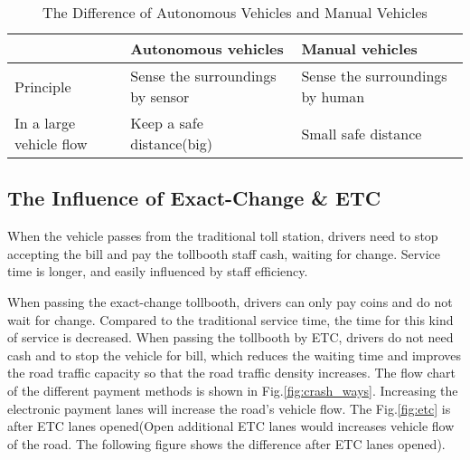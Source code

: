 \documentclass{mcmthesis}
\begin{document}
\begin{table}
	\centering
	\caption{\label{tab:test}The Difference of Autonomous Vehicles and Manual Vehicles}
	\begin{tabular}{p{3cm}p{5cm}p{5cm}}
		\toprule
		& Autonomous vehicles & Manual vehicles\\ 
		\midrule
		Principle& Sense the surroundings by sensor& Sense the surroundings by human  \\ 
		In a large vehicle flow& Keep a safe distance(big)&Small safe distance \\
		\bottomrule
	\end{tabular} 
	
\end{table}

\subsection{The Influence of Exact-Change \& ETC}
When the vehicle passes from the traditional toll station, drivers need to stop accepting the bill and pay the tollbooth staff cash, waiting for change. Service time is longer, and easily influenced by staff efficiency.  

When passing the exact-change tollbooth, drivers can only pay coins and do not wait for change. Compared to the traditional service time, the time for this kind of service is decreased.
When passing the tollbooth by ETC, drivers do not need cash and to stop the vehicle for bill, which reduces the waiting time and improves the road traffic capacity so that the road traffic density increases\cite{spiliopoulou2009toll}.
The flow chart of the different payment methods is shown in Fig.\ref{fig:crash_ways}.
Increasing the electronic payment lanes will increase the road’s vehicle flow. The Fig.\ref{fig:etc} is after ETC lanes opened(Open additional ETC lanes would increases vehicle flow of the road. The following figure shows the difference after ETC lanes opened).
\end{document}
